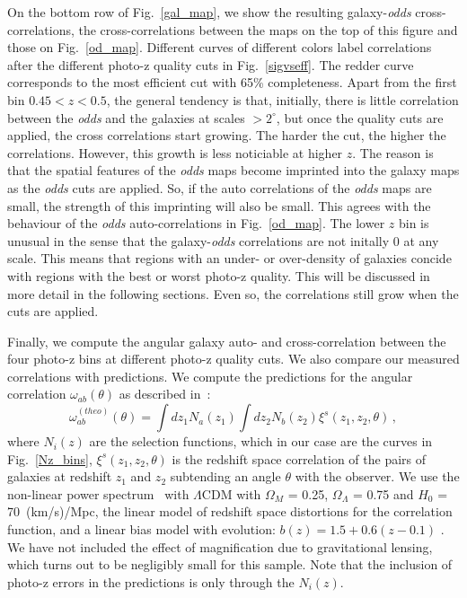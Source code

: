 On the bottom row of Fig.~\ref{gal_map}, we show the resulting galaxy-\textit{odds} cross-cor\-relat\-ions, the cross-correlations between the maps on the top of this figure and those on Fig.~\ref{od_map}. Different curves of different colors label correlations after the different photo-z quality cuts in Fig.~\ref{sigvseff}. The redder curve corresponds to the most efficient cut with 65\% completeness. Apart from the first bin $0.45<z<0.5$, the general tendency is that, initially, there is little correlation between the \textit{odds} and the galaxies at scales $>2^\circ$, but once the quality cuts are applied, the cross correlations start growing. The harder the cut, the higher the correlations. However, this growth is less noticiable at higher $z$. The reason is that  the spatial features of the \textit{odds} maps become imprinted into the galaxy maps as the \textit{odds} cuts are applied. So, if the auto correlations of the \textit{odds} maps are small, the strength of this imprinting will also be small. This agrees with the behaviour of the \textit{odds} auto-correlations in Fig.~\ref{od_map}. The lower $z$ bin is unusual in the sense that the galaxy-\textit{odds} correlations are not initally 0 at any scale. This means that regions with an under- or over-density of galaxies concide with regions with the best or worst photo-z quality. This will be discussed in more detail in the following sections. Even so, the correlations still grow when the cuts are applied.

Finally, we compute the angular galaxy auto- and cross-correlation between the four photo-z bins at different photo-z quality cuts. We also compare our measured correlations with predictions. We compute the predictions for the angular correlation $\omega_{ab}(\theta)$ as described in~\cite{Crocce2011}:
\begin{equation}
\omega_{ab}^{(theo)} (\theta) = \int dz_1 N_a(z_1) \int dz_2 N_b(z_2) \xi^s(z_1,z_2,\theta) \, ,
\label{corr_prediction}
\end{equation}
where $N_i(z)$ are the selection functions, which in our case are the curves in Fig.~\ref{Nz_bins}, $\xi^s(z_1,z_2,\theta)$ is the redshift space correlation of the pairs of galaxies at redshift $z_1$ and $z_2$ subtending an angle $\theta$ with the observer. We use the non-linear power spectrum~\citep{Smith2003} with $\Lambda$CDM with $\Omega_M$ = 0.25, $\Omega_\Lambda$ = 0.75 and $H_0$ = 70~(km/s)/Mpc, the linear \citet{Kaiser1984} model of redshift space distortions for the correlation function, and a linear bias model with evolution: $b(z) = 1.5 + 0.6(z-0.1)$ \citep{Cabre2009}. We have not included the effect of magnification due to gravitational lensing, which turns out to be negligibly small for this sample. Note that the inclusion of photo-z errors in the predictions is only through the $N_i(z)$. 

